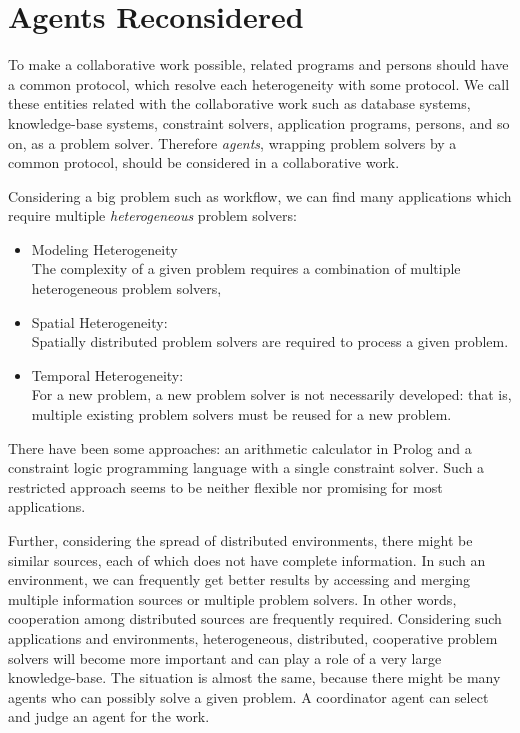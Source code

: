 
%

\chapter{Agents Reconsidered}
\label{chap:agentReconsidered}

To make a collaborative work possible, related programs and persons
should have a common protocol, which resolve each heterogeneity with
some protocol.  We call these entities related with the collaborative
work such as database systems, knowledge-base systems, constraint
solvers, application programs, persons, and so on, as a problem solver.
Therefore {\em agents}, wrapping problem solvers by a common protocol,
should be considered in a collaborative work.

Considering a big problem such as workflow, 
we can find many applications which
require multiple {\em heterogeneous} problem solvers:
\begin{itemize}\itemsep0mm
\item Modeling Heterogeneity\\
The complexity of a given problem requires a combination of multiple
heterogeneous problem solvers,
\item Spatial Heterogeneity:\\
Spatially distributed problem solvers are required to process a given
problem.
\item Temporal Heterogeneity:\\
For a new problem, a new problem solver is not necessarily developed:
that is, multiple existing problem solvers must be reused for a new
problem.
\end{itemize}
There have been some approaches: an arithmetic calculator in Prolog
and a constraint logic programming language with a single constraint
solver.  Such a restricted approach seems to be neither flexible nor
promising for most applications.

Further, considering the spread of distributed environments, there
might be similar sources, each of which does not have complete
information.  
In such an environment, we can frequently get better results by
accessing and merging multiple information sources or multiple
problem solvers.
In other words, cooperation among distributed sources are frequently
required.
Considering such applications and environments, heterogeneous,
distributed, cooperative problem solvers will become more important
and can play a role of a very large knowledge-base.
The situation is almost the same, because there might be many agents
who can possibly solve a given problem.
A coordinator agent can select and judge an agent for the work.

